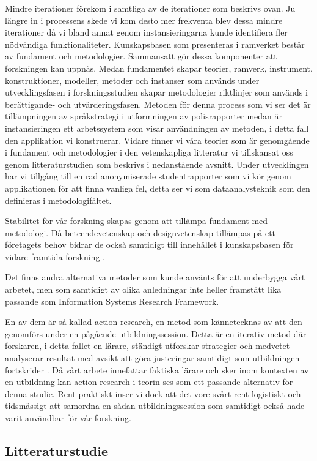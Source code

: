\documentclass[swedish]{maucsthesis}
\begin{document}
Mindre iterationer förekom i samtliga av de iterationer som beskrivs ovan. Ju längre in i processens skede vi kom desto mer frekventa blev dessa mindre iterationer då vi bland annat genom instansieringarna kunde identifiera fler nödvändiga funktionaliteter. 
Kunskapsbasen som presenteras i ramverket består av fundament och metodologier.
Sammansatt gör dessa komponenter att forskningen kan uppnås. Medan fundamentet
skapar teorier, ramverk, instrument, konstruktioner, modeller, metoder och
instanser som används under utvecklingsfasen i forskningsstudien skapar
metodologier riktlinjer som används i berättigande- och utvärderingsfasen.
Metoden för denna process som vi ser det är tillämpningen av språkstrategi i
utformningen av polisrapporter medan är instansieringen ett arbetssystem som
visar användningen av metoden, i detta fall den applikation vi konstruerar.
Vidare finner vi våra teorier som är genomgående i fundament och metodologier i
den vetenskapliga litteratur vi tillskansat oss genom litteraturstudien som
beskrivs i nedanstående avsnitt. Under utvecklingen har vi tillgång till en rad
anonymiserade studentrapporter som vi kör genom applikationen för att finna
vanliga fel, detta ser vi som dataanalysteknik som den definieras i
metodologifältet.

Stabilitet för vår forskning skapas genom att tillämpa fundament med metodologi.
Då beteendevetenskap och designvetenskap tillämpas på ett företagets behov
bidrar de också samtidigt till innehållet i kunskapsbasen för vidare framtida
forskning \cite{hevner:2004}.

Det finns andra alternativa metoder som kunde använts för att underbygga vårt arbetet, men som samtidigt av olika anledningar inte heller framstått lika passande som Information Systems Research Framework.

En av dem är så kallad action research, en metod som kännetecknas av att den genomförs under en pågående utbildningssession. Detta är en iterativ metod där forskaren, i detta fallet en lärare, ständigt utforskar strategier och medvetet analyserar resultat med avsikt att göra justeringar samtidigt som utbildningen fortskrider \citep{clement:2004}. Då vårt arbete innefattar faktiska lärare och sker inom kontexten av en utbildning kan action research i teorin ses som ett passande alternativ för denna studie. Rent praktiskt inser vi dock att det vore svårt rent logistiskt och tidsmässigt att samordna en sådan utbildningssession som samtidigt också hade varit användbar för vår forskning.

\subsection{Litteraturstudie}
\end{document}
